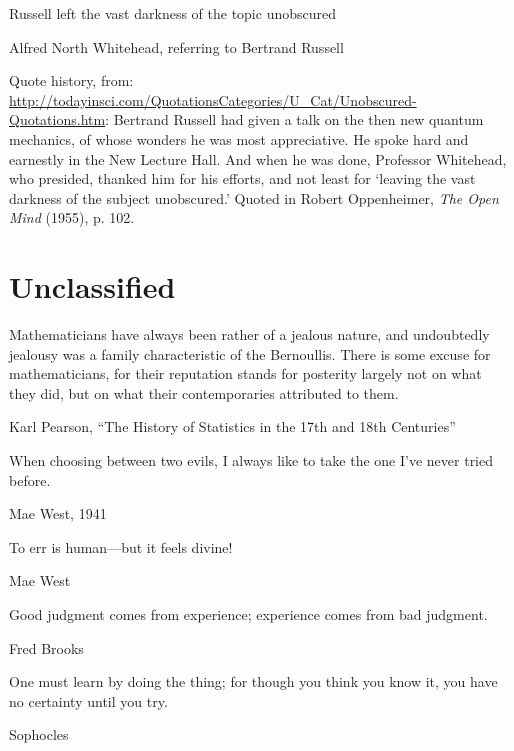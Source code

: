 \epigraph{Russell left the vast darkness of the topic unobscured}{Alfred North Whitehead, referring to Bertrand Russell}

Quote history, from: \url{http://todayinsci.com/QuotationsCategories/U_Cat/Unobscured-Quotations.htm}:
Bertrand Russell had given a talk on the then new quantum mechanics, of whose wonders he was most appreciative. He spoke hard and earnestly in the New Lecture Hall. And when he was done, Professor Whitehead, who presided, thanked him for his efforts, and not least for `leaving the vast darkness of the subject unobscured.' 
Quoted in Robert Oppenheimer, \emph{The Open Mind} (1955), p. 102. 


\section{Unclassified}


\epigraph{Mathematicians have always been rather of a jealous nature, and undoubtedly jealousy was a family characteristic of the Bernoullis.  There is some excuse for mathematicians, for their reputation stands for posterity largely not on what they did, but on what their contemporaries attributed to them.}{Karl Pearson, ``The History of Statistics in the 17th and 18th Centuries'' \cite[p. 226]{Pearson:1978}}

\epigraph{When choosing between two evils, I always like to take the one I've never tried before.}{Mae West, 1941}

\epigraph{To err is human---but it feels divine!}{Mae West}

\epigraph{Good judgment comes from experience; experience comes from bad judgment.}{Fred Brooks}


\epigraph{One must learn by doing the thing; for though you think you know it, you have no certainty until you try.}{Sophocles}


	

